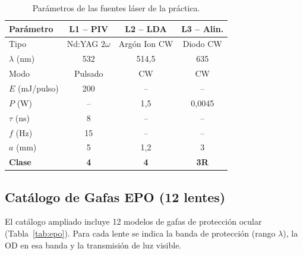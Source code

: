 \documentclass[12pt,a4paper]{article}
\begin{document}
\begin{table}[H]
	\centering
	\caption{Parámetros de las fuentes láser de la práctica.}
	\label{tab:lasers}
	\small
	\begin{tabular}{l c c c}
		\toprule
		\textbf{Parámetro} & \textbf{L1 -- PIV} & \textbf{L2 -- LDA} & \textbf{L3 -- Alin.} \\
		\midrule
		Tipo               & Nd:YAG $2\omega$   & Argón Ion CW       & Diodo CW             \\
		$\lambda$ (nm)     & 532                & 514,5              & 635                  \\
		Modo               & Pulsado            & CW                 & CW                   \\
		$E$ (mJ/pulso)     & 200                & {--}               & {--}                 \\
		$P$ (W)            & {--}               & 1,5                & 0,0045               \\
		$\tau$ (ns)        & 8                  & {--}               & {--}                 \\
		$f$ (Hz)           & 15                 & {--}               & {--}                 \\
		$a$ (mm)           & 5                  & 1,2                & 3                    \\
		\rowcolor{aerored!15}
		\textbf{Clase}     & \textbf{4}         & \textbf{4}         & \textbf{3R}          \\
		\bottomrule
	\end{tabular}
\end{table}

\subsection{Catálogo de Gafas EPO (12 lentes)}
\label{sec:catalogo}

El catálogo ampliado incluye 12 modelos de gafas de protección ocular
(Tabla~\ref{tab:epo}). Para cada lente se indica la banda de protección
(rango $\lambda$), la OD en esa banda y la transmisión de luz visible.
\end{document}
